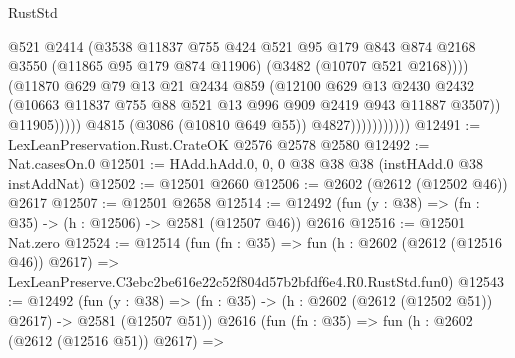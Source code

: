 \begin{lexlean}{RustStd}
\begin{coremodule}
                                    @521
                                    @2414
                                    (@3538
                                      @11837
                                      @755
                                      @424
                                      @521
                                      @95
                                      @179
                                      @843
                                      @874
                                      @2168
                                      @3550
                                      (@11865 @95 @179 @874 @11906)
                                      (@3482 (@10707 @521 @2168))))
                                  (@11870
                                    @629
                                    @79
                                    @13
                                    @21
                                    @2434
                                    @859
                                    (@12100
                                      @629
                                      @13
                                      @2430
                                      @2432
                                      (@10663
                                        @11837
                                        @755
                                        @88
                                        @521
                                        @13
                                        @996
                                        @909
                                        @2419
                                        @943
                                        @11887
                                        @3507))
                                    @11905)))))
                          @4815
                          (@3086 (@10810 @649 @55))
                          @4827)))))))))))
@12491 := LexLeanPreservation.Rust.CrateOK @2576 @2578 @2580
@12492 := Nat.casesOn.{0}
@12501 := HAdd.hAdd.{0, 0, 0} @38 @38 @38 (instHAdd.{0} @38 instAddNat)
@12502 := @12501 @2660
@12506 := @2602 (@2612 (@12502 @46)) @2617
@12507 := @12501 @2658
@12514 := @12492 (fun (y : @38) => (fn : @35) -> (h : @12506) -> @2581 (@12507 @46)) @2616
@12516 := @12501 Nat.zero
@12524 := @12514
    (fun (fn : @35) =>
    fun (h : @2602 (@2612 (@12516 @46)) @2617) =>
    LexLeanPreserve.C3ebc2be616e22c52f804d57b2bfdf6e4.R0.RustStd.fun0)
@12543 := @12492
    (fun (y : @38) => (fn : @35) -> (h : @2602 (@2612 (@12502 @51)) @2617) -> @2581 (@12507 @51))
    @2616
    (fun (fn : @35) =>
    fun (h : @2602 (@2612 (@12516 @51)) @2617) =>

\end{coremodule}
\end{lexlean}
